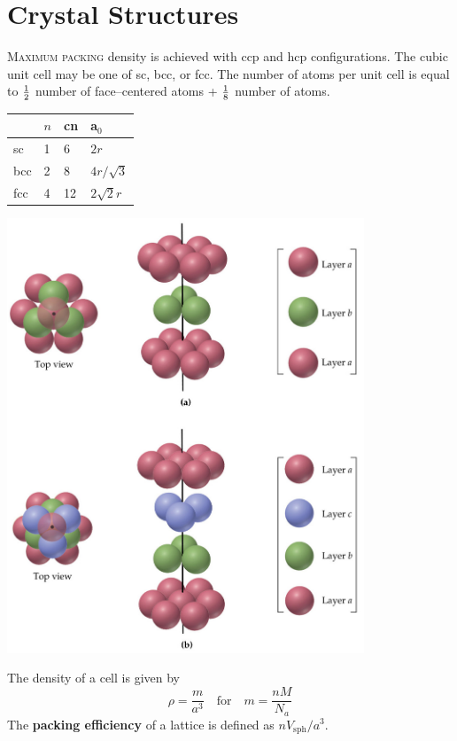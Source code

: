 \documentclass{tufte-book}
\renewcommand{\emph}[1]{\textbf{#1}}
\begin{document}
\section{Crystal Structures}
\textsc{Maximum packing} density is achieved with ccp and hcp configurations. The cubic unit cell may be one of sc, bcc, or fcc. The number of atoms per unit cell is equal to $1 \over 2$ number of face--centered atoms + $1 \over 8$ number of atoms.
\begin{center}
  \begin{tabular}{llll}
    & $n$ & cn & a$_0$ \\
    \hline
    sc & 1 & 6 & $2r$ \\
    bcc & 2 & 8 & $4r / \sqrt 3$ \\
    fcc & 4 & 12 & $2 \sqrt 2r$
  \end{tabular}
\end{center}
%
\begin{marginfigure}[-10mm]
\begin{center}
  \includegraphics[width=0.8\textwidth]{matsci}
\end{center}
\end{marginfigure}
%
The density of a cell is given by \begin{equation}
  \rho = \frac{m}{a^3} \quad\text{for}\quad m = \frac{nM}{N_a}
\end{equation}
The \emph{packing efficiency} of a lattice is defined as $n V_{\text{sph}} / a^3$.
\end{document}
